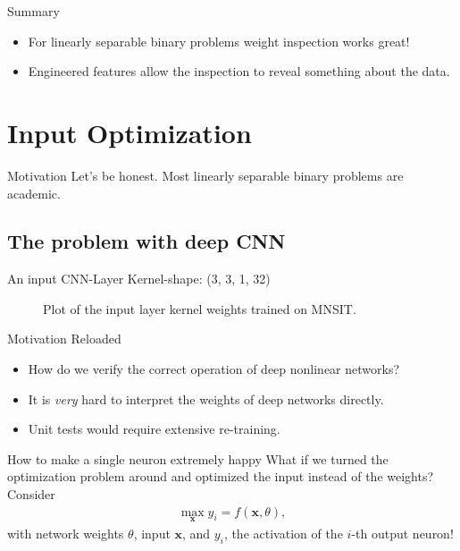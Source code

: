 \documentclass{beamer}
\begin{document}
    \begin{frame}{Summary}
      \begin{itemize}
        \item For linearly separable binary problems weight inspection works great!
        \item Engineered features allow the inspection to reveal something about the data.
      \end{itemize}
    \end{frame}

    \section{Input Optimization}

    \begin{frame}{Motivation}
      Let's be honest. Most linearly separable binary problems are academic.
    \end{frame}

    \subsection{The problem with deep CNN}
    \begin{frame}{An input CNN-Layer}
      Kernel-shape: (3, 3, 1, 32)
      \begin{figure}
        
        \caption{Plot of the input layer kernel weights trained on MNSIT.}
      \end{figure}
    \end{frame}

    \begin{frame}{Motivation Reloaded}
      \begin{itemize}
        \item How do we verify the correct operation of deep nonlinear networks?
        \item It is \textit{very} hard to interpret the weights of deep networks directly.
        \item Unit tests would require extensive re-training.
      \end{itemize}
    \end{frame}



    \begin{frame}{How to make a single neuron extremely happy}
      What if we turned the optimization problem around and optimized the input instead of the weights?
      Consider
      \begin{align}
        \max_\mathbf{x} y_i = f(\mathbf{x}, \theta) ,
      \end{align}
      with network weights $\theta$, input $\mathbf{x}$, and $y_i$, the activation of the $i$-th output neuron!
    \end{frame}
\end{document}
